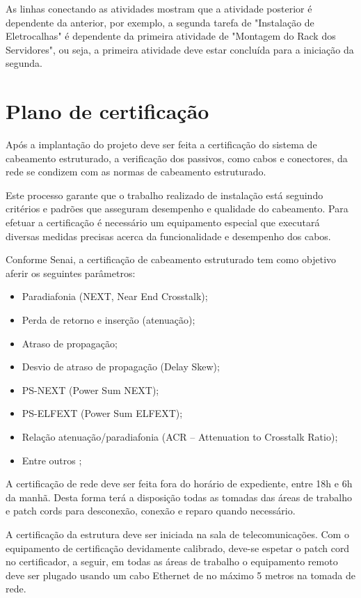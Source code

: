 \documentclass[	DIV=calc,%
							paper=a4,%
							fontsize=12pt,%
							onecolumn]{scrartcl}	 					%
\begin{document}
As linhas conectando as atividades mostram que a atividade posterior é dependente da anterior, por exemplo, a segunda tarefa de "Instalação de Eletrocalhas" é dependente da primeira atividade de "Montagem do Rack dos Servidores", ou seja, a primeira atividade deve estar concluída para a iniciação da segunda.\newpage

\section{Plano de certificação}

Após a implantação do projeto deve ser feita a certificação do sistema de cabeamento estruturado, a verificação dos passivos, como cabos e conectores, da rede se condizem com as normas de cabeamento estruturado. 

Este processo garante que o trabalho realizado de instalação está seguindo critérios e padrões que asseguram desempenho e qualidade do cabeamento. Para efetuar a certificação é necessário um equipamento especial que executará diversas medidas precisas acerca da funcionalidade e desempenho dos cabos.

Conforme Senai, a certificação de cabeamento estruturado tem como objetivo  aferir os seguintes parâmetros:
\begin{itemize}
	\item Paradiafonia (NEXT, Near End Crosstalk);
	\item Perda de retorno e inserção (atenuação);
	\item Atraso de propagação;
	\item Desvio de atraso de propagação (Delay Skew);
	\item PS-NEXT (Power Sum NEXT);
	\item PS-ELFEXT (Power Sum ELFEXT);
	\item Relação atenuação/paradiafonia (ACR – Attenuation to Crosstalk Ratio);
	\item Entre outros \cite{senai2012};
\end{itemize}

A certificação de rede deve ser feita fora do horário de expediente, entre 18h e 6h da manhã. Desta forma terá a disposição todas as tomadas das áreas de trabalho e patch cords para desconexão, conexão e reparo quando necessário.

A certificação da estrutura deve ser iniciada na sala de telecomunicações. Com o equipamento de certificação devidamente calibrado, deve-se espetar o patch cord no certificador, a seguir, em todas as áreas de trabalho o equipamento remoto deve ser plugado usando um cabo Ethernet de no máximo 5 metros na tomada de rede.
\end{document}
